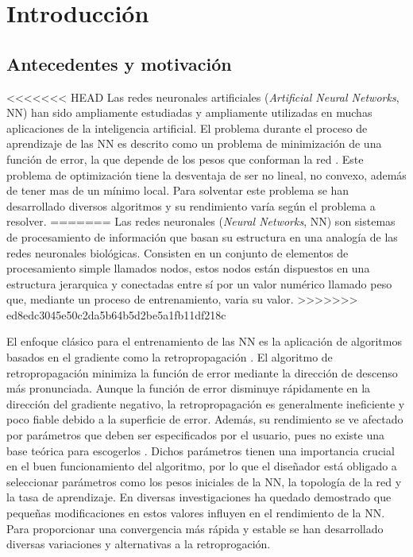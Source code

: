 \chapter{Introducción}
\section{Antecedentes y motivación}
<<<<<<< HEAD
Las redes neuronales artificiales ({\em Artificial Neural Networks}, NN) han sido ampliamente estudiadas y ampliamente utilizadas en muchas aplicaciones de la inteligencia artificial. El problema durante el proceso de aprendizaje de las NN es descrito como un problema de minimización de una función de error, la que depende de los pesos que conforman la red \cite{Rumelhart1986}. Este problema de optimización tiene la desventaja de ser no lineal, no convexo, además de tener mas de un mínimo local. Para solventar este problema se han desarrollado diversos algoritmos \cite{Grippo1994,Jacobs1988,Plagianakos2002,Rumelhart1986b,Plagianakos1998}  y su rendimiento varía según el problema a resolver.
=======
Las redes neuronales ({\em Neural Networks}, NN) son sistemas de procesamiento de información que basan su estructura en una analogía de las redes neuronales biológicas. Consisten en un conjunto de elementos de procesamiento simple llamados nodos, estos nodos están dispuestos en una estructura jerarquica y conectadas entre sí por un valor numérico llamado peso que, mediante un proceso de entrenamiento, varia su valor.
>>>>>>> ed8edc3045e50c2da5b64b5d2be5a1fb11df218c

El enfoque clásico para el entrenamiento de las NN es la aplicación de algoritmos basados en el gradiente como la retropropagación \cite{Rumelhart1986b}. El algoritmo de retropropagación minimiza la función de error mediante la dirección de descenso más pronunciada. Aunque la función de error disminuye rápidamente en la dirección del gradiente negativo, la retropropagación es generalmente ineficiente y poco fiable \cite{Gori1992} debido a la superficie de error. Además, su rendimiento se ve afectado por parámetros que deben ser especificados por el usuario, pues no existe una base teórica para escogerlos \cite{Nguyen1990}. Dichos parámetros tienen una importancia crucial en el buen funcionamiento del algoritmo, por lo que el diseñador está obligado a seleccionar parámetros como los pesos iniciales de la NN, la topología de la red y la tasa de aprendizaje. En diversas investigaciones \cite{Cauchy1847, Grippo1994, Plagianakos1998, Plagianakos2002} ha quedado demostrado que pequeñas modificaciones en estos valores influyen en el rendimiento de la NN. Para proporcionar una convergencia más rápida y estable se han desarrollado diversas variaciones y alternativas a la retroprogación.

